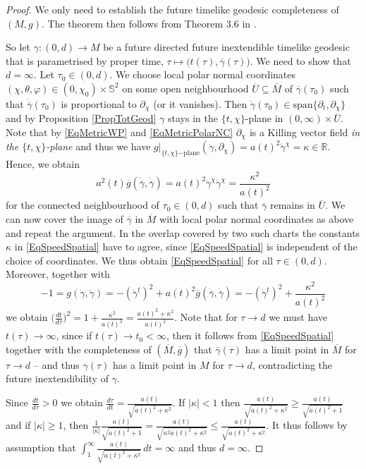 \documentclass[reqno]{article}
\newcommand{\R}{\mathbb{R}}
\begin{document}
\begin{proof}
We only need to establish the future timelike geodesic completeness of $(M,g)$. The theorem then follows from Theorem 3.6 in \cite{GalLinSbi17}.

So let $\gamma : (0,d) \to M$ be a future directed future inextendible timelike geodesic that is parametrised by proper time, $\tau \mapsto \big(t(\tau), \overline{\gamma}(\tau)\big)$. We need to show that $d = \infty$. Let $\tau_0 \in (0,d)$. We choose local polar normal coordinates $(\chi, \theta, \varphi) \in (0,\chi_0) \times \mathbb{S}^2$ on some open neighbourhood $\overline{U} \subseteq \overline{M}$ of $\overline{\gamma}(\tau_0)$ such that $\dot{\overline{\gamma}}(\tau_0)$ is proportional to $\partial_\chi$ (or it vanishes). Then $\dot{\gamma}(\tau_0) \in \mathrm{span} \{\partial_t, \partial_\chi\}$ and by Proposition \ref{PropTotGeod} $\gamma$ stays in the $\{t,\chi\}$-plane in $(0,\infty) \times \overline{U}$. Note that by \eqref{EqMetricWP} and \eqref{EqMetricPolarNC} $\partial_\chi$ is a Killing vector field \emph{in the $\{t,\chi\}$-plane} and thus we have $g|_{\{t,\chi\}\mathrm{-plane}}(\dot{\gamma}, \partial_\chi) = a(t)^2 \dot{\gamma}^\chi = \kappa \in \R$. Hence, we obtain
\begin{equation}\label{EqSpeedSpatial}
a^2(t) \overline{g}(\dot{\overline{\gamma}}, \dot{\overline{\gamma}}) = a(t)^2 \dot{\gamma}^\chi \dot{\gamma}^\chi = \frac{\kappa^2}{a(t)^2}
\end{equation}
for the connected neighbourhood of $\tau_0 \in (0,d)$ such that $\overline{\gamma}$ remains in $\overline{U}$. We can now cover the image of $\overline{\gamma}$ in $\overline{M}$ with local polar normal coordinates as above and repeat the argument. In the overlap covered by two such charts the constants $\kappa$ in \eqref{EqSpeedSpatial} have to agree, since \eqref{EqSpeedSpatial} is independent of the choice of coordinates. We thus obtain \eqref{EqSpeedSpatial} for all $\tau \in (0,d)$. Moreover, together with  $$-1 = g(\dot{\gamma}, \dot{\gamma}) = -(\dot{\gamma}^t)^2 + a(t)^2\overline{g}(\dot{\overline{\gamma}}, \dot{\overline{\gamma}})  = -(\dot{\gamma}^t)^2 + \frac{\kappa^2}{a(t)^2} $$ we obtain $\Big(\frac{dt}{d\tau}\Big)^2 = 1 + \frac{\kappa^2}{a(t)^2} = \frac{a(t)^2 + \kappa^2}{a(t)^2}$. Note that for $\tau \to d$ we must have $t(\tau) \to \infty$, since if $t(\tau) \to t_0 < \infty$, then it follows from \eqref{EqSpeedSpatial} together with the completeness of $(\overline{M}, \overline{g})$ that $\overline{\gamma}(\tau)$ has a limit point in $\overline{M}$ for $\tau \to d$ -- and thus $\gamma(\tau)$ has a limit point in $M$ for $\tau \to d$, contradicting the future inextendibility of $\gamma$. 

Since $\frac{dt}{d\tau} >0$ we obtain $\frac{d \tau}{dt}  = \frac{a(t)}{\sqrt{a(t)^2 + \kappa^2}}$. 
If $|\kappa| < 1$ then $\frac{a(t)}{\sqrt{a(t)^2 + \kappa^2}} \geq \frac{a(t)}{\sqrt{a(t)^2 + 1}}$ and if $|\kappa| \geq 1$, then $\frac{1}{|\kappa|} \frac{a(t)}{\sqrt{a(t)^2 + 1}} = \frac{a(t)}{\sqrt{\kappa^2 a(t)^2 + \kappa^2}} \leq \frac{a(t)}{\sqrt{a(t)^2 + \kappa^2}}$. It thus follows by assumption that $\int_1^\infty \frac{a(t)}{\sqrt{a(t)^2 + \kappa^2}} \, dt = \infty$ and thus $d = \infty$.
\end{proof}
\end{document}
